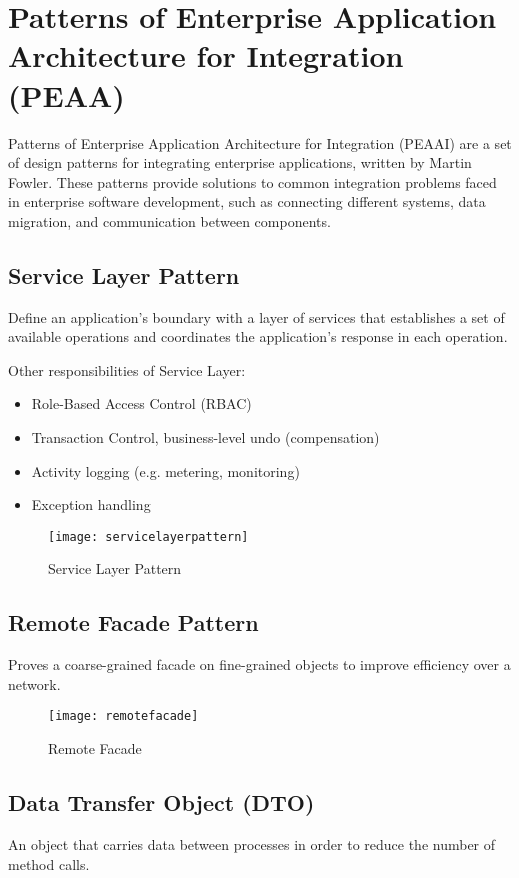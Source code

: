\section{Patterns of Enterprise Application Architecture for Integration (PEAA)}
Patterns of Enterprise Application Architecture for Integration (PEAAI) are a set of design patterns for integrating enterprise applications, written by Martin Fowler. These patterns provide solutions to common integration problems faced in enterprise software development, such as connecting different systems, data migration, and communication between components.

\subsection{Service Layer Pattern}
Define an application's boundary with a layer of services that establishes a set of available operations and coordinates the application's response in each operation.

Other responsibilities of Service Layer:
\begin{itemize}
	\item Role-Based Access Control (RBAC)
	\item Transaction Control, business-level undo (compensation)
	\item Activity logging (e.g. metering, monitoring)
	\item Exception handling
\end{itemize}

\begin{figure}[H]
  \center
  \texttt{[image: servicelayerpattern]}
  \caption{Service Layer Pattern}
\end{figure}

\subsection{Remote Facade Pattern}
Proves a coarse-grained facade on fine-grained objects to improve efficiency over a network.

\begin{figure}[H]
  \center
  \texttt{[image: remotefacade]}
  \caption{Remote Facade}
\end{figure}

\subsection{Data Transfer Object (DTO)}
An object that carries data between processes in order to reduce the number of method calls. 

